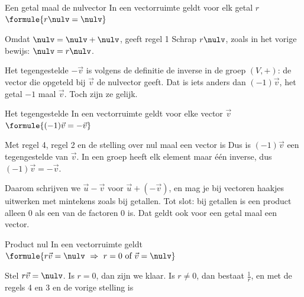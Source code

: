 \begin{theorie}
\begin{stelling}{Een getal maal de nulvector}
In een vectorruimte geldt voor elk getal $r$ \quad $\formule{r\nulv = \nulv}$
\end{stelling}

\begin{bewijs}
Omdat $\nulv = \nulv + \nulv$, geeft regel 1
Schrap $r\nulv$, zoals in het vorige bewijs: $\nulv = r\nulv$.
\end{bewijs}
\end{theorie}

Het tegengestelde $-\vec v$ is volgens de definitie de inverse in de groep $(V, +)$: de vector die opgeteld bij $\vec v$ de nulvector geeft. Dat is iets anders dan $(-1)\vec v$, het getal $-1$ maal $\vec v$. Toch zijn ze gelijk.

\begin{theorie}
\begin{stelling}{Het tegengestelde}
In een vectorruimte geldt voor elke vector $\vec v$ \quad $\formule{(-1)\vec v = -\vec v}$
\end{stelling}

\begin{bewijs}
Met regel 4, regel 2 en de stelling over nul maal een vector is
Dus is $(-1)\vec v$ een tegengestelde van $\vec v$. In een groep heeft elk element maar één inverse, dus $(-1)\vec v = -\vec v$.
\end{bewijs}
\end{theorie}

Daarom schrijven we $\vec u - \vec v$ voor $\vec u + (-\vec v)$, en mag je bij vectoren haakjes uitwerken met mintekens zoals bij getallen. Tot slot: bij getallen is een product alleen 0 als een van de factoren 0 is. Dat geldt ook voor een getal maal een vector.

\begin{theorie}
\begin{stelling}{Product nul}
In een vectorruimte geldt \quad $\formule{r\vec v = \nulv \ \Rightarrow \ r = 0 \text{ of } \vec v = \nulv}$
\end{stelling}

\begin{bewijs}
Stel $r\vec v = \nulv$. Is $r = 0$, dan zijn we klaar. Is $r \neq 0$, dan bestaat $\frac1r$, en met de regels 4 en 3 en de vorige stelling is
\end{bewijs}
\end{theorie}

